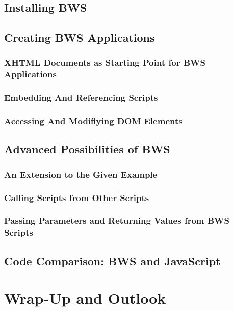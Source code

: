  \section{Installing BWS}
 \section{Creating BWS Applications}
 \label{sec:CreatingBWSApplications}
 
  \subsection{XHTML Documents as Starting Point for BWS Applications}
  \label{sec:XHTMLDocumentsAsStartingPoint}

   

  \subsection{Embedding And Referencing Scripts}

 

  \subsection{Accessing And Modifiying DOM Elements}


 \section{Advanced Possibilities of BWS}
  \subsection{An Extension to the Given Example}
  \subsection{Calling Scripts from Other Scripts}
  \subsection{Passing Parameters and Returning Values from BWS Scripts}
 \section{Code Comparison: BWS and JavaScript}
\chapter{Wrap-Up and Outlook}